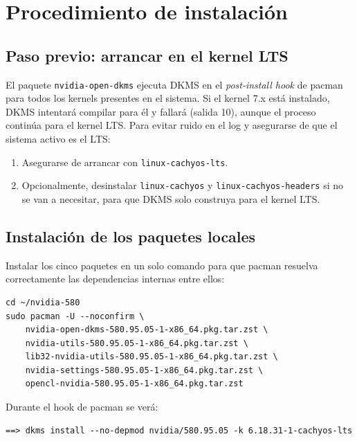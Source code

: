 \documentclass[12pt,a4paper]{article}
\begin{document}
\section{Procedimiento de instalación}

\subsection{Paso previo: arrancar en el kernel LTS}

El paquete \texttt{nvidia-open-dkms} ejecuta DKMS en el
\emph{post-install hook} de pacman para todos los kernels presentes en el
sistema. Si el kernel 7.x está instalado, DKMS intentará compilar para él
y fallará (salida 10), aunque el proceso continúa para el kernel LTS. Para
evitar ruido en el log y asegurarse de que el sistema activo es el LTS:

\begin{enumerate}
  \item Asegurarse de arrancar con \texttt{linux-cachyos-lts}.
  \item Opcionalmente, desinstalar \texttt{linux-cachyos} y
        \texttt{linux-cachyos-headers} si no se van a necesitar,
        para que DKMS solo construya para el kernel LTS.
\end{enumerate}

\subsection{Instalación de los paquetes locales}

Instalar los cinco paquetes en un solo comando para que pacman resuelva
correctamente las dependencias internas entre ellos:

\begin{lstlisting}[style=bash]
cd ~/nvidia-580
sudo pacman -U --noconfirm \
    nvidia-open-dkms-580.95.05-1-x86_64.pkg.tar.zst \
    nvidia-utils-580.95.05-1-x86_64.pkg.tar.zst \
    lib32-nvidia-utils-580.95.05-1-x86_64.pkg.tar.zst \
    nvidia-settings-580.95.05-1-x86_64.pkg.tar.zst \
    opencl-nvidia-580.95.05-1-x86_64.pkg.tar.zst
\end{lstlisting}

Durante el hook de pacman se verá:

\begin{lstlisting}[style=bash]
==> dkms install --no-depmod nvidia/580.95.05 -k 6.18.31-1-cachyos-lts
\end{lstlisting}
\end{document}
